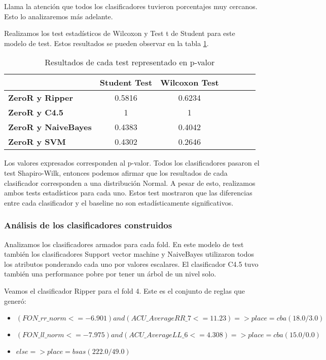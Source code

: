 Llama la atención que todos los clasificadores tuvieron porcentajes muy cercanos. Esto lo analizaremos más adelante. 

Realizamos los test estadísticos de Wilcoxon y Test t de Student para este modelo de test. Estos resultados se pueden observar en la tabla  \ref{res_tests_wilcoxon_student}.

\begin{table}[H]
	\centering
	\begin{tabular}{|l|c|c|c|c|c|c|}
		\hline
		\textbf{}  & \textbf{Student Test} & \textbf{Wilcoxon Test} \\ \hline
		\textbf{ZeroR y Ripper}  & 0.5816 & 0.6234 \\ \hline
		\textbf{ZeroR y C4.5}  & 1 & 1 \\ \hline
		\textbf{ZeroR y NaiveBayes}  & 0.4383 & 0.4042 \\ \hline
		\textbf{ZeroR y SVM}  & 0.4302 & 0.2646 \\ \hline
	\end{tabular}
	\caption{Resultados de cada test representado en p-valor}
	\label{res_tests_wilcoxon_student}
\end{table}

Los valores expresados corresponden al p-valor. Todos los clasificadores pasaron el test Shapiro-Wilk, entonces podemos afirmar que los resultados de cada clasificador corresponden a una distribución Normal. A pesar de esto, realizamos ambos tests estadísticos para cada uno. Estos test mostraron que las diferencias entre cada clasificador y el baseline no son estadísticamente significativos.

\subsubsection{Análisis de los clasificadores construidos}

Analizamos los clasificadores armados para cada fold. En este modelo de test también los clasificadores Support vector machine y NaiveBayes utilizaron todos los atributos ponderando cada uno por valores escalares. El clasificador C4.5 tuvo también una performance pobre por tener un árbol de un nivel solo. 

Veamos el clasificador Ripper para el fold 4. Este es el conjunto de reglas que generó:

\begin{flushleft}
	\begin{itemize}
		\item $(FON\_rr\_norm <= -6.901) and (ACU\_AverageRR\_7 <= 11.23) => place=cba (18.0/3.0)$ \\
		\item $(FON\_ll\_norm <= -7.975) and (ACU\_AverageLL\_6 <= 4.308) => place=cba (15.0/0.0)$
		\item $else => place=bsas (222.0/49.0)$
	\end{itemize}
\end{flushleft}

